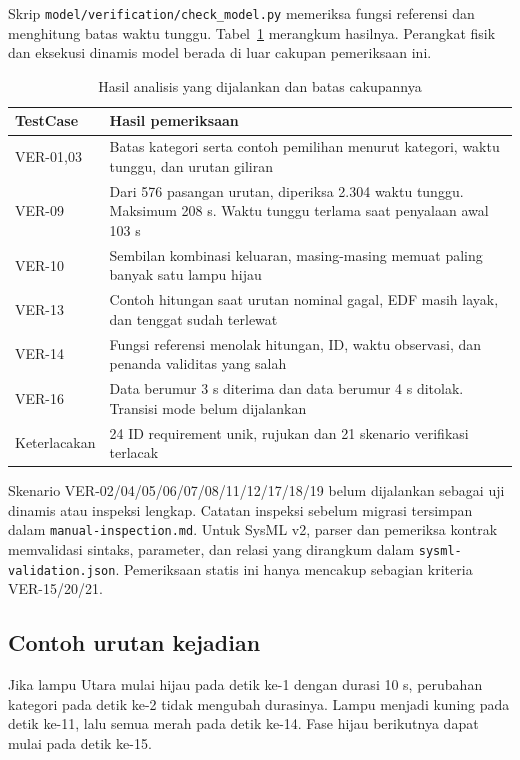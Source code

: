 Skrip \texttt{model/verification/check\_model.py} memeriksa fungsi referensi dan menghitung batas waktu tunggu. Tabel~\ref{tab:results} merangkum hasilnya. Perangkat fisik dan eksekusi dinamis model berada di luar cakupan pemeriksaan ini.
\begin{table}[H]\centering
\caption{Hasil analisis yang dijalankan dan batas cakupannya}\label{tab:results}
\begin{tabular}{|p{.22\linewidth}|p{.65\linewidth}|}
\hline
\textbf{TestCase} & \textbf{Hasil pemeriksaan} \\ \hline
VER-01,03 & Batas kategori serta contoh pemilihan menurut kategori, waktu tunggu, dan urutan giliran \\ \hline
VER-09 & Dari 576 pasangan urutan, diperiksa 2.304 waktu tunggu. Maksimum 208 s. Waktu tunggu terlama saat penyalaan awal 103 s \\ \hline
VER-10 & Sembilan kombinasi keluaran, masing-masing memuat paling banyak satu lampu hijau \\ \hline
VER-13 & Contoh hitungan saat urutan nominal gagal, EDF masih layak, dan tenggat sudah terlewat \\ \hline
VER-14 & Fungsi referensi menolak hitungan, ID, waktu observasi, dan penanda validitas yang salah \\ \hline
VER-16 & Data berumur 3 s diterima dan data berumur 4 s ditolak. Transisi mode belum dijalankan \\ \hline
Keterlacakan & 24 ID requirement unik, rujukan dan 21 skenario verifikasi terlacak \\ \hline
\end{tabular}
\end{table}
Skenario VER-02/04/05/06/07/08/11/12/17/18/19 belum dijalankan sebagai uji dinamis atau inspeksi lengkap. Catatan inspeksi sebelum migrasi tersimpan dalam \texttt{manual-inspection.md}. Untuk SysML v2, parser dan pemeriksa kontrak memvalidasi sintaks, parameter, dan relasi yang dirangkum dalam \texttt{sysml-validation.json}. Pemeriksaan statis ini hanya mencakup sebagian kriteria VER-15/20/21.

\subsection{Contoh urutan kejadian}
Jika lampu Utara mulai hijau pada detik ke-1 dengan durasi 10 s, perubahan kategori pada detik ke-2 tidak mengubah durasinya. Lampu menjadi kuning pada detik ke-11, lalu semua merah pada detik ke-14. Fase hijau berikutnya dapat mulai pada detik ke-15.

